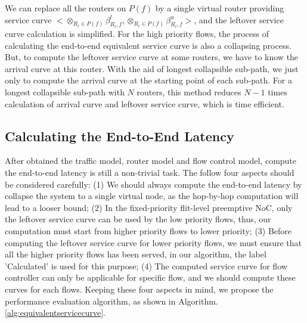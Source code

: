 \documentclass[10pt,journal]{IEEEtran}
\begin{document}
We can replace all the routers on $P(f)$ by a single virtual router providing service curve $<\otimes_{R_i\in P(f)}\beta_{R_i,f}^l,\otimes_{R_i\in P(f)}\beta_{R_i,f}^u>$, and the leftover service curve calculation is simplified. For the high priority flows, the process of calculating the end-to-end equivalent service curve is also a collapsing process. But, to compute the leftover service curve at some routers, we have to know the arrival curve at this router. With the aid of longest collapsible sub-path, we just only to compute the arrival curve at the starting point of each sub-path. For a longest collapsible sub-path with $N$ routers, this method reduces $N-1$ times calculation of arrival curve and leftover service curve, which is time efficient.

\subsection{Calculating the End-to-End Latency}
After obtained the traffic model, router model and flow control model, compute the end-to-end latency is still a non-trivial task. The follow four aspects should be considered carefully: (1) We should always compute the end-to-end latency by collapse the system to a single virtual node, as the hop-by-hop computation will lead to a looser bound; (2) In the fixed-priority flit-level preemptive NoC, only the leftover service curve can be used by the low priority flows, thus, our computation must start from higher priority flows to lower priority; (3) Before computing the leftover service curve for lower priority flows, we must ensure that all the higher priority flows has been served, in our algorithm, the label 'Calculated' is used for this purpose; (4) The computed service curve for flow controller can only be applicable for specific flow, and we should compute these curves for each flows. Keeping these four aspects in mind, we propose the performance evaluation algorithm, as shown in Algorithm. \ref{alg:equivalentservicecurve}.
\end{document}
